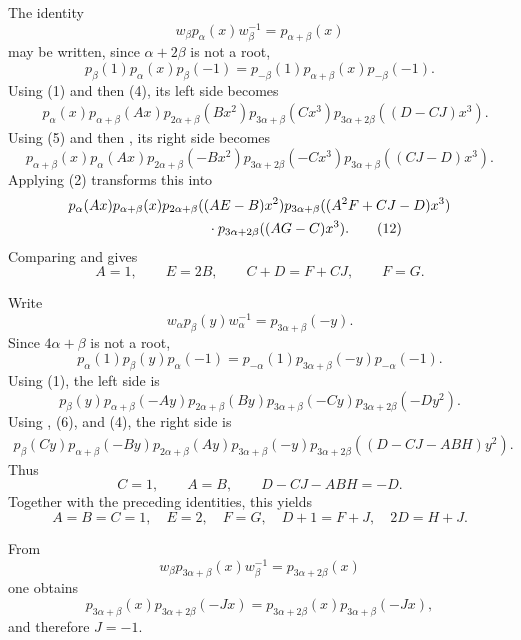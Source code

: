 The identity
\[
  w_\beta p_\alpha(x)w_\beta^{-1}=p_{\alpha+\beta}(x)
\]
may be written, since \(\alpha+2\beta\) is not a root,
\begin{equation}
  p_\beta(1)p_\alpha(x)p_\beta(-1)
   =p_{-\beta}(1)p_{\alpha+\beta}(x)p_{-\beta}(-1).
  \tag{9}\label{sga3:XXIII:3.4:eq9}
\end{equation}
Using (1) and then (4), its left side becomes
\begin{align}
 &p_\alpha(x)p_{\alpha+\beta}(Ax)p_{2\alpha+\beta}(Bx^2)
   p_{3\alpha+\beta}(Cx^3)
   p_{3\alpha+2\beta}((D-CJ)x^3). \tag{10}\label{sga3:XXIII:3.4:eq10}
\end{align}
Using (5) and then , its right side becomes
\[
 p_{\alpha+\beta}(x)p_\alpha(Ax)p_{2\alpha+\beta}(-Bx^2)
 p_{3\alpha+2\beta}(-Cx^3)p_{3\alpha+\beta}((CJ-D)x^3).
\]
Applying (2) transforms this into
\begin{align}
 &p_\alpha(Ax)p_{\alpha+\beta}(x)
 p_{2\alpha+\beta}((AE-B)x^2)
 p_{3\alpha+\beta}((A^2F+CJ-D)x^3)\notag\\
 &\hspace{35mm}\cdot
 p_{3\alpha+2\beta}((AG-C)x^3). \tag{12}\label{sga3:XXIII:3.4:eq12}
\end{align}
Comparing  and  gives
\[
  A=1,\qquad E=2B,\qquad C+D=F+CJ,\qquad F=G.
\]

Write
\[
  w_\alpha p_\beta(y)w_\alpha^{-1}=p_{3\alpha+\beta}(-y).
\]
Since \(4\alpha+\beta\) is not a root,
\begin{equation}
 p_\alpha(1)p_\beta(y)p_\alpha(-1)
  =p_{-\alpha}(1)p_{3\alpha+\beta}(-y)p_{-\alpha}(-1).
 \tag{13}\label{sga3:XXIII:3.4:eq13}
\end{equation}
Using (1), the left side is
\[
 p_\beta(y)p_{\alpha+\beta}(-Ay)p_{2\alpha+\beta}(By)
 p_{3\alpha+\beta}(-Cy)p_{3\alpha+2\beta}(-Dy^2).
\]
Using , (6), and (4), the right side is
\[
\begin{aligned}
 p_\beta(Cy)p_{\alpha+\beta}(-By)p_{2\alpha+\beta}(Ay)
 p_{3\alpha+\beta}(-y)
 p_{3\alpha+2\beta}((D-CJ-ABH)y^2).
\end{aligned}
\]
Thus
\[
  C=1,\qquad A=B,\qquad D-CJ-ABH=-D.
\]
Together with the preceding identities, this yields
\[
 A=B=C=1,\quad E=2,\quad F=G,\quad
 D+1=F+J,\quad 2D=H+J.
\]

From
\[
  w_\beta p_{3\alpha+\beta}(x)w_\beta^{-1}
    =p_{3\alpha+2\beta}(x)
\]
one obtains
\[
  p_{3\alpha+\beta}(x)p_{3\alpha+2\beta}(-Jx)
   =p_{3\alpha+2\beta}(x)p_{3\alpha+\beta}(-Jx),
\]
and therefore \(J=-1\).

